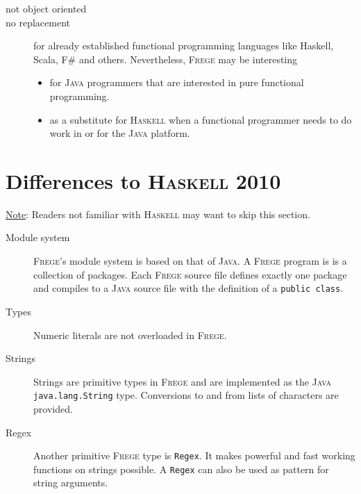 \documentclass[lletterpaper,12pt]{report}
\newcommand{\boxquote}[3]{
\begin{center}
\colorbox{#1}%
{\parbox{0.9\textwidth}{
\sf
\underline{#2}:
#3
}}
\end{center}}
\newcommand{\note}[1]{\boxquote{grau}{Note}{#1}}
\newcommand{\haskell}[0]{\textsc{Haskell}}
\newcommand{\frege}[0]{\textsc{Frege}}
\newcommand{\java}[0]{\textsc{Java}}
\begin{document}
\begin{description}

\item[not object oriented]

\item[no replacement]

for already established functional programming languages like Haskell,
Scala, F\# and others.
Nevertheless, \frege{} may be interesting
\begin{itemize}
\item for \java{} programmers that are interested in pure functional programming. 
\item as a substitute for \haskell{} when a functional programmer needs to do work in or for the \java{} platform. 
\end{itemize}

\end{description}

\section{Differences to \haskell{} 2010}

\note{Readers not familiar with \haskell{} may want to skip this
section.}

\begin{description}
\item[Module system]
\frege{}'s module system is based on that of \java{}. A \frege{}
program is is a collection of packages. Each \frege{}
source file defines exactly one package
and compiles to a \java{} source file with the definition of a
\texttt{public class}.


\item[Types]

Numeric literals are not overloaded in \frege{}. 

\item[Strings]
Strings are primitive types in \frege{} and are implemented
as the \java{} \texttt{java.lang.String} type.
Conversions to and
from lists of characters are provided.

\item[Regex]
\par Another primitive \frege{} type is \texttt{Regex}. It makes
powerful
and fast working functions on strings possible. A \texttt{Regex} can
also
be used as pattern for string arguments.

\end{description}
\end{document}

